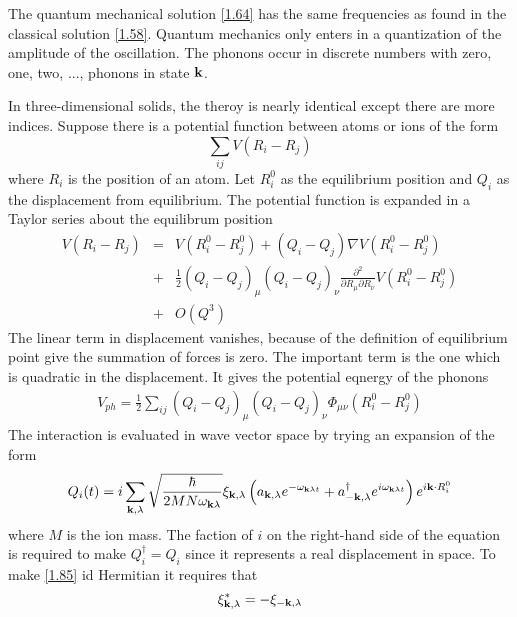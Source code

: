 The quantum mechanical solution \eqref{1.64} has the same frequencies as found in the classical solution \eqref{1.58}.
Quantum mechanics only enters in a quantization of the amplitude of the oscillation.
The phonons occur in discrete numbers with zero, one, two, ..., phonons in state $\mathbf{k}$.

In three-dimensional solids, the theroy is nearly identical except there are more indices.
Suppose there is a potential function between atoms or ions of the form
\begin{equation}
    \sum_{ij} V(R_i - R_j)  \label{1.79}
\end{equation}
where $R_i$ is the position of an atom.
Let $R_i^0$ as the equilibrium position and $Q_i$ as the displacement from equilibrium.
The potential function is expanded in a Taylor series about the equilibrum position
\begin{eqnarray}
    V(R_i-R_j) &=& V(R_i^0 - R_j^0) + (Q_i - Q_j) \nabla V(R_i^0 - R_j^0) \nonumber \\
    &+& \frac{1}{2} (Q_i - Q_j)_\mu (Q_i - Q_j)_\nu \frac{\partial^2}{\partial R_\mu \partial R_\nu}  V(R^0_i - R^0_j) \nonumber \\
    &+& O(Q^3)  \label{1.81}
\end{eqnarray}
The linear term in displacement vanishes, because of the definition of equilibrium point give the summation of forces is zero.
The important term is the one which is quadratic in the displacement.
It gives the potential eqnergy of the phonons
\begin{eqnarray}
    V_{ph} = \frac{1}{2} \sum_{ij} (Q_i-Q_j)_\mu (Q_i-Q_j)_\nu \Phi_{\mu\nu}(R_i^0 - R_j^0)     \label{1.83}
\end{eqnarray}
The interaction is evaluated in wave vector space by trying an expansion of the form
\begin{equation}
    Q_i(t) = i \sum_{\mathbf{k},\lambda} \sqrt{ \frac{\hbar}{2MN \omega_{\mathbf{k}\lambda}} } \xi_{\mathbf{k},\lambda} \left( a_{\mathbf{k},\lambda} e^{-\omega_{\mathbf{k}\lambda t}} + a^\dagger_{-\mathbf{k},\lambda} e^{i\omega_{\mathbf{k}\lambda t}} \right) e^{i \mathbf{k} \cdot R_i^0} \label{1.85}
\end{equation}
where $M$ is the ion mass.
The faction of $i$ on the right-hand side of the equation is required to make $Q_i^\dagger = Q_i$ since it represents a real displacement in space.
To make \eqref{1.85} id Hermitian it requires that
\begin{equation}
    \xi^*_{\mathbf{k},\lambda} = - \xi_{-\mathbf{k},\lambda}   \label{1.86}
\end{equation}
